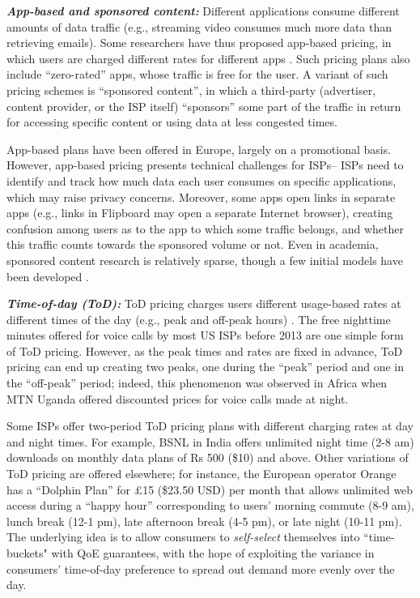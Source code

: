 \textbf{\emph{App-based and sponsored content:}}
Different applications consume different amounts of data traffic (e.g., streaming video consumes much more data than retrieving emails). Some researchers have thus proposed app-based pricing, in which users are charged different rates for different apps \cite{Ericsson}. Such pricing plans also include ``zero-rated'' apps, whose traffic is free for the user. A variant of such pricing schemes is ``sponsored content'', in which a third-party (advertiser, content provider, or the ISP itself) ``sponsors'' some part of the traffic in return for accessing specific content or using data at less congested times. 

App-based plans have been offered in Europe, largely on a promotional basis. However, app-based pricing presents technical challenges for ISPs-- ISPs need to identify and track how much data each user consumes on specific applications, which may raise privacy concerns. Moreover, some apps open links in separate apps (e.g., links in Flipboard may open a separate Internet browser), creating confusion among users as to the app to which some traffic belongs, and whether this traffic counts towards the sponsored volume or not. Even in academia, sponsored content research is relatively sparse, though a few initial models have been developed \cite{andrewsSDP,hande2009network}.

\textbf{\emph{Time-of-day (ToD):}} ToD pricing charges users different usage-based rates at different times of the day (e.g., peak and off-peak hours) \cite{ParrisF}. The free nighttime minutes offered for voice calls by most US ISPs before 2013 are one simple form of ToD pricing. However, as the peak times and rates are fixed in advance, ToD pricing can end up creating two peaks, one during the ``peak'' period and one in the ``off-peak'' period; indeed, this phenomenon was observed in Africa when MTN Uganda offered discounted prices for voice calls made at night. 

Some ISPs offer two-period ToD pricing plans with different charging rates at day and night times.  For example, BSNL in India offers unlimited night time (2-8 am) downloads on monthly data plans of Rs 500 (\$10) and above. Other variations of ToD pricing are offered elsewhere; for instance, the European operator Orange has a ``Dolphin Plan''  for $\pounds$15 (\$23.50 USD) per month that allows unlimited web access during a ``happy hour'' corresponding to users' morning commute (8-9 am), lunch break (12-1 pm), late afternoon break (4-5 pm), or late night (10-11 pm). The underlying idea is to allow consumers to \emph{self-select} themselves into ``time-buckets" with QoE guarantees, with the hope of exploiting the variance in consumers' time-of-day preference to spread out demand more evenly over the day.


